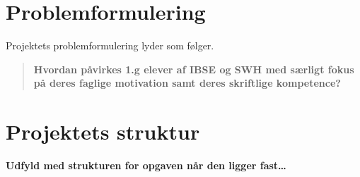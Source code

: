 \section{Problemformulering}
\label{sec:1.2}
Projektets problemformulering lyder som følger.
\begin{quote}
	{\bfseries Hvordan påvirkes 1.g elever af IBSE og SWH med særligt fokus på deres faglige motivation samt deres skriftlige kompetence?}
\end{quote}

\section{Projektets struktur}
\label{sec:1.3}

{\bfseries \color{red} Udfyld med strukturen for opgaven når den ligger fast\ldots}
 